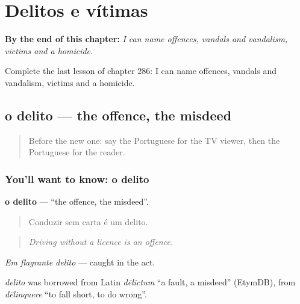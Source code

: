 
\chapter{Delitos e vítimas}
\label{ch:pt-delitos-e-vitimas}

\begin{chapteropening}
\textbf{By the end of this chapter:} \emph{I can name offences, vandals and vandalism, victims and a homicide.}

Complete the last lesson of chapter 286: I can name offences, vandals and vandalism, victims and a homicide.
\end{chapteropening}

\section[o delito]{o delito — the offence, the misdeed}

\label{lesson:PT-C286-delito}



\begin{quote}
Before the new one: say the Portuguese for the TV viewer, then the Portuguese for the reader.
\end{quote}

\subsection*{You'll want to know: o delito}
\textbf{o delito} — \textquotedblleft{}the offence, the misdeed\textquotedblright{}.

\begin{quote}
Conduzir sem carta é um delito.
\end{quote}

\begin{quote}
\emph{Driving without a licence is an offence.}
\end{quote}

\emph{Em flagrante delito} — caught in the act.

\begin{cousinweb}
\emph{delito} was borrowed from Latin \emph{dēlictum} \textquotedblleft{}a fault, a misdeed\textquotedblright{} (EtymDB), from \emph{dēlinquere} \textquotedblleft{}to fall short, to do wrong\textquotedblright{}.
\end{cousinweb}

